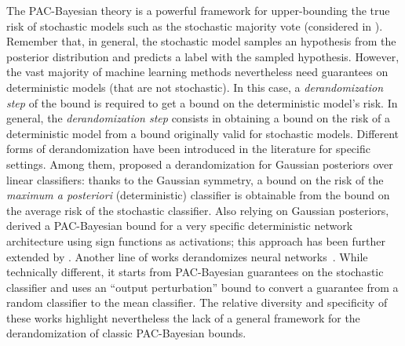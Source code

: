 The PAC-Bayesian theory is a powerful framework for upper-bounding the true risk of stochastic models such as the stochastic majority vote (considered in ).
Remember that, in general, the stochastic model samples an hypothesis from the posterior distribution and predicts a label with the sampled hypothesis.
However, the vast majority of machine learning methods nevertheless need guarantees on deterministic models (\ie that are not stochastic).
In this case, a {\it derandomization step} of the bound is required to get a bound on the deterministic model's risk.
In general, the {\it derandomization step} consists in obtaining a bound on the risk of a deterministic model from a bound originally valid for stochastic models.
Different forms of derandomization have been introduced in the literature for specific settings.
Among them, \citet{LangfordShaweTaylor2002} proposed a derandomization for Gaussian posteriors over linear classifiers: thanks to the Gaussian symmetry, a bound on the risk of the {\it maximum a posteriori} (deterministic) classifier is obtainable from the bound on the average risk of the stochastic classifier.
Also relying on Gaussian posteriors, \citet{LetarteGermainGuedjLaviolette2019} derived a PAC-Bayesian bound for a very specific deterministic network architecture using sign functions as activations; this approach has been further extended by \citet{BiggsGuedj2021,BiggsGuedj2022}.
Another line of works derandomizes neural networks~\citep{NeyshaburBhojanapalliSrebro2018, NagarajanKolter2019}.
While technically different, it starts from PAC-Bayesian guarantees on the stochastic classifier and uses an ``output perturbation'' bound to convert a guarantee from a random classifier to the mean classifier.
The relative diversity and specificity of these works highlight nevertheless the lack of a general framework for the derandomization of classic PAC-Bayesian bounds.\\

